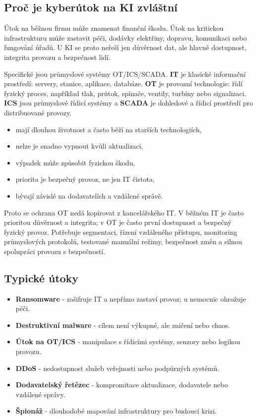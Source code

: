 \documentclass[11pt,a4paper]{article}
\begin{document}
\subsection*{Proč je kyberútok na KI zvláštní}
Útok na běžnou firmu může znamenat finanční škodu. Útok na kritickou infrastrukturu může zastavit péči, dodávky elektřiny, dopravu, komunikaci nebo fungování úřadů. U KI se proto neřeší jen důvěrnost dat, ale hlavně dostupnost, integrita provozu a bezpečnost lidí.

Specifické jsou průmyslové systémy OT/ICS/SCADA. \textbf{IT} je klasické informační prostředí: servery, stanice, aplikace, databáze. \textbf{OT} je provozní technologie: řídí fyzický proces, například tlak, průtok, spínače, ventily, turbíny nebo signalizaci. \textbf{ICS} jsou průmyslové řídicí systémy a \textbf{SCADA} je dohledové a řídicí prostředí pro distribuované provozy.
\begin{itemize}
  \item mají dlouhou životnost a často běží na starších technologiích,
  \item nelze je snadno vypnout kvůli aktualizaci,
  \item výpadek může způsobit fyzickou škodu,
  \item priorita je bezpečný provoz, ne jen IT čistota,
  \item bývají závislé na dodavatelích a vzdálené správě.
\end{itemize}
Proto se ochrana OT nedá kopírovat z kancelářského IT. V běžném IT je často prioritou důvěrnost a integrita; v OT je často první dostupnost a bezpečný fyzický provoz. Potřebuje segmentaci, řízení vzdáleného přístupu, monitoring průmyslových protokolů, testované manuální režimy, bezpečnost změn a silnou spolupráci provozu s bezpečností.

\subsection*{Typické útoky}
\begin{itemize}
  \item \textbf{Ransomware} - zašifruje IT a nepřímo zastaví provoz; u nemocnic ohrožuje péči.
  \item \textbf{Destruktivní malware} - cílem není výkupné, ale zničení nebo chaos.
  \item \textbf{Útok na OT/ICS} - manipulace s řídicími systémy, senzory nebo logikou provozu.
  \item \textbf{DDoS} - nedostupnost služeb veřejnosti nebo podpůrných systémů.
  \item \textbf{Dodavatelský řetězec} - kompromitace aktualizace, dodavatele nebo vzdálené správy.
  \item \textbf{Špionáž} - dlouhodobé mapování infrastruktury pro budoucí krizi.
\end{itemize}
\end{document}
